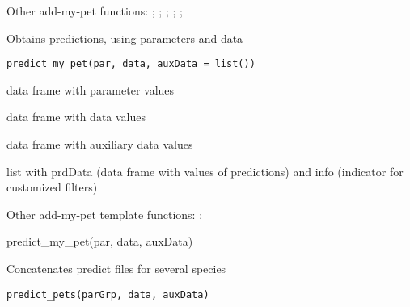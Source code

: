 \documentclass[a4paper]{book}
\begin{document}
%
\begin{SeeAlso}\relax
Other add-my-pet functions: ;
; ;
; ;
\end{SeeAlso}
%
\begin{Description}\relax
Obtains predictions, using parameters and data
\end{Description}
%
\begin{Usage}
\begin{verbatim}
predict_my_pet(par, data, auxData = list())
\end{verbatim}
\end{Usage}
%
\begin{Arguments}
\begin{ldescription}
\item[\code{par}] data frame with parameter values

\item[\code{data}] data frame with data values

\item[\code{auxData}] data frame with auxiliary data values
\end{ldescription}
\end{Arguments}
%
\begin{Value}
list with prdData (data frame with values of predictions) and info (indicator for customized filters)
\end{Value}
%
\begin{SeeAlso}\relax
Other add-my-pet template functions: ;
\end{SeeAlso}
%
\begin{Examples}
\begin{ExampleCode}
predict_my_pet(par, data, auxData)
\end{ExampleCode}
\end{Examples}
%
\begin{Description}\relax
Concatenates predict files for several species
\end{Description}
%
\begin{Usage}
\begin{verbatim}
predict_pets(parGrp, data, auxData)
\end{verbatim}
\end{Usage}
\end{document}
